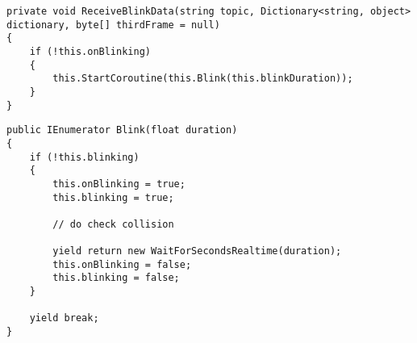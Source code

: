 \begin{lstlisting}[caption=Methode ReceiveBlinkData,label=lstlisting:ReceiveBlinkData]
private void ReceiveBlinkData(string topic, Dictionary<string, object> dictionary, byte[] thirdFrame = null)
{
	if (!this.onBlinking)
	{
		this.StartCoroutine(this.Blink(this.blinkDuration));
	}
}
\end{lstlisting}

\begin{lstlisting}[caption=Ausschnitt aus Methode Blink,label=lstlisting:Blink]
public IEnumerator Blink(float duration)
{
	if (!this.blinking)
	{
		this.onBlinking = true;
		this.blinking = true;
		
		// do check collision
		
		yield return new WaitForSecondsRealtime(duration);
		this.onBlinking = false;
		this.blinking = false;
	}
	
	yield break;
}
\end{lstlisting}

